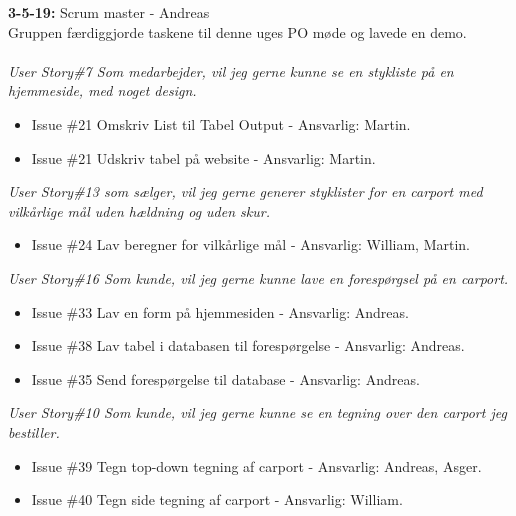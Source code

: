 \documentclass[11pt]{report}
\begin{document}
\noindent\textbf{3-5-19:} Scrum master - Andreas\\
Gruppen færdiggjorde taskene til denne uges PO møde og lavede en demo.\\\\
\textit{User Story\#7 Som medarbejder, vil jeg gerne kunne se en stykliste på en hjemmeside, med noget design.}
\begin{itemize}
\renewcommand\labelitemi{--}
\item Issue \#21 Omskriv List til Tabel Output - Ansvarlig: Martin.
\item Issue \#21 Udskriv tabel på website - Ansvarlig: Martin.
\end{itemize}
\textit{User Story\#13 som sælger, vil jeg gerne generer styklister for en carport med vilkårlige mål uden hældning og uden skur.}
\begin{itemize}
\renewcommand\labelitemi{--}
\item Issue \#24 Lav beregner for vilkårlige mål - Ansvarlig: William, Martin.
\end{itemize}
\textit{User Story\#16 Som kunde, vil jeg gerne kunne lave en forespørgsel på en carport.}
\begin{itemize}
\renewcommand\labelitemi{--}
\item Issue \#33 Lav en form på hjemmesiden - Ansvarlig: Andreas.
\item Issue \#38 Lav tabel i databasen til forespørgelse - Ansvarlig: Andreas.
\item Issue \#35 Send forespørgelse til database - Ansvarlig: Andreas.
\end{itemize}
\textit{User Story\#10 Som kunde, vil jeg gerne kunne se en tegning over den carport jeg bestiller.}
\begin{itemize}
\renewcommand\labelitemi{--}
\item Issue \#39 Tegn top-down tegning af carport - Ansvarlig: Andreas, Asger.
\item Issue \#40 Tegn side tegning af carport - Ansvarlig: William.
\end{itemize}
\end{document}
